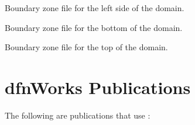 \documentclass[letterpaper,10pt,english]{sphinxmanual}
\begin{document}

\label{\detokenize{output:pboundary-left-w-zone}}
Boundary zone file for the left side of the domain.


\label{\detokenize{output:pboundary-right-e-zone}}
Boundary zone file for the bottom of the domain.


\label{\detokenize{output:pboundary-top-zone}}
Boundary zone file for the top of the domain.


\chapter{dfnWorks Publications}
\label{\detokenize{publications:dfnworks-publications}}\label{\detokenize{publications::doc}}\label{\detokenize{publications:publications-chapter}}
The following are publications that use :
\end{document}
